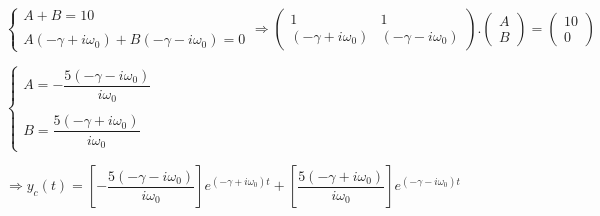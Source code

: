\documentclass[fleqn]{article}
\begin{document}
\begin{enumerate}
\begin{enumerate}
        \bigbreak

        \textcolor{hwColor}{
          $
            \begin{cases}
              A+B=10 \\
              \\
              A(-\gamma+i\omega_0)+B(-\gamma-i\omega_0)=0
            \end{cases}
            \Longrightarrow \begin{pmatrix}
              1 & 1 \\
              (-\gamma+i\omega_0) & (-\gamma-i\omega_0)
            \end{pmatrix}.\begin{pmatrix}
              A \\
              B
            \end{pmatrix}=\begin{pmatrix}
              10 \\
              0
            \end{pmatrix}
          $
        }

        \bigbreak

        \textcolor{hwColor}{
          $
            \begin{cases}
              A=-\dfrac{5(-\gamma-i\omega_0)}{i \omega_0}
              \\
              \\
              B=\dfrac{5(-\gamma+i\omega_0)}{i \omega_0}
            \end{cases}
          $
        }

        \bigbreak

        \textcolor{hwColor}{
          $
            \Longrightarrow y_c(t)=\left[-\dfrac{5(-\gamma-i\omega_0)}{i \omega_0}\right]e^{(-\gamma+i\omega_0)t}+\left[\dfrac{5(-\gamma+i\omega_0)}{i \omega_0}\right]e^{(-\gamma-i\omega_0)t}
          $
        }

      \end{enumerate}
  \end{enumerate}
\end{document}
